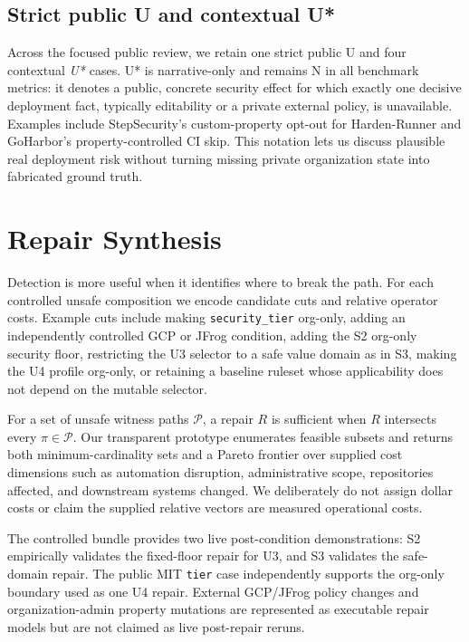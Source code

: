 \documentclass[sigconf,review,anonymous]{acmart}
\newcommand{\U}{\textsf{U}}
\newcommand{\N}{\textsf{N}}
\begin{document}
\subsection{Strict public U and contextual U*}

Across the focused public review, we retain one strict public \U{} and four
contextual \emph{U*} cases.  U* is narrative-only and remains \N{} in all
benchmark metrics: it denotes a public, concrete security effect for which
exactly one decisive deployment fact, typically editability or a private
external policy, is unavailable.  Examples include StepSecurity's
custom-property opt-out for Harden-Runner and GoHarbor's property-controlled CI
skip.  This notation lets us discuss plausible real deployment risk without
turning missing private organization state into fabricated ground truth.

\section{Repair Synthesis}

Detection is more useful when it identifies where to break the path.  For each
controlled unsafe composition we encode candidate cuts and relative operator
costs.  Example cuts include making \texttt{security\_tier} org-only, adding an
independently controlled GCP or JFrog condition, adding the S2 org-only security
floor, restricting the U3 selector to a safe value domain as in S3, making the
U4 profile org-only, or retaining a baseline ruleset whose applicability does
not depend on the mutable selector.

For a set of unsafe witness paths $\mathcal{P}$, a repair $R$ is sufficient when
$R$ intersects every $\pi\in\mathcal{P}$.  Our transparent prototype enumerates
feasible subsets and returns both minimum-cardinality sets and a Pareto frontier
over supplied cost dimensions such as automation disruption, administrative
scope, repositories affected, and downstream systems changed.  We deliberately
do not assign dollar costs or claim the supplied relative vectors are measured
operational costs.

The controlled bundle provides two live post-condition demonstrations: S2
empirically validates the fixed-floor repair for U3, and S3 validates the
safe-domain repair.  The public MIT \texttt{tier} case independently supports
the org-only boundary used as one U4 repair.  External GCP/JFrog policy changes
and organization-admin property mutations are represented as executable repair
models but are not claimed as live post-repair reruns.
\end{document}
